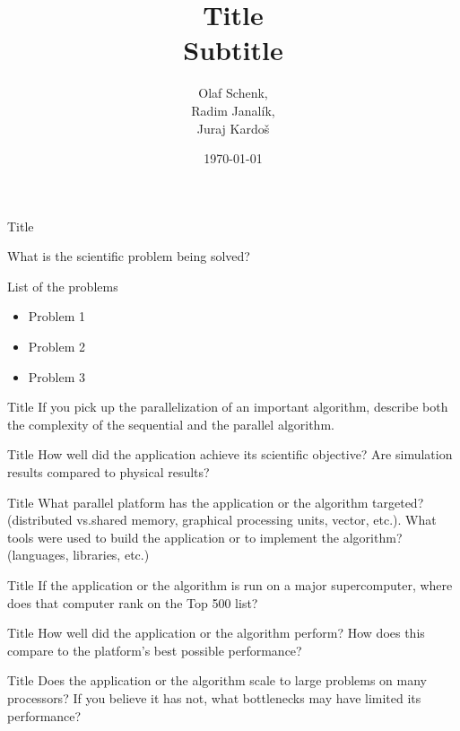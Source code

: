 \documentclass[aspectratio=43]{beamer}
\title[Title]{\textbf{Title\\ Subtitle}}
\author{Olaf Schenk, \\Radim Janalík, \\Juraj Kardo\v{s}}
\institute{Faculty of Informatics}
\date{\today}
\begin{document}
\begin{frame}
\titlepage
\end{frame}


\begin{frame}[fragile]{Title}

What is the scientific problem being solved?
\begin{block}{List of the problems}
    \begin{itemize}
        \item Problem 1
        \item Problem 2
        \item Problem 3
    \end{itemize}
\end{block}

\end{frame}
\begin{frame}[fragile]{Title}
If you pick up the parallelization of an important algorithm, describe both the complexity of the sequential and the parallel algorithm.
\end{frame}
\begin{frame}[fragile]{Title}
How well did the application achieve its scientific objective? Are simulation results compared to physical results?
\end{frame}
\begin{frame}[fragile]{Title}
What parallel platform has the application or the algorithm targeted? (distributed vs.shared memory, graphical processing units, vector, etc.). What tools were used to build the application or to implement the algorithm? (languages, libraries, etc.)
\end{frame}
\begin{frame}[fragile]{Title}
If the application or the algorithm is run on a major supercomputer, where does that computer rank on the Top 500 list?
\end{frame}
\begin{frame}[fragile]{Title}
How well did the application or the algorithm perform? How does this compare to the platform’s best possible performance?
\end{frame}
\begin{frame}[fragile]{Title}
Does the application or the algorithm scale to large problems on many processors? If you believe it has not, what bottlenecks may have limited its performance?
\end{frame}
\end{document}
